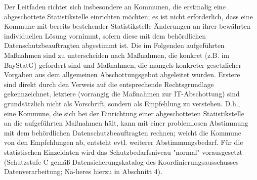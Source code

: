 Der Leitfaden richtet sich insbesondere an Kommunen, die erstmalig eine abgeschottete Statistikstelle einrichten möchten; es ist nicht erforderlich, dass eine Kommune mit bereits bestehender Statistikstelle Änderungen an ihrer bewährten individuellen Lösung vornimmt, sofern diese mit dem behördlichen Datenschutzbeauftragten abgestimmt ist.
Die im Folgenden aufgeführten Maßnahmen sind zu unterscheiden nach Maßnahmen, die konkret (z.B. im BayStatG) gefordert sind und Maßnahmen, die mangels konkreter gesetzlicher Vorgaben aus dem allgemeinen Abschottungsgebot abgeleitet wurden. Erstere sind direkt durch den Verweis auf die entsprechende Rechtsgrundlage gekennzeichnet, letztere (vorrangig die Maßnahmen zur IT-Abschottung) sind grundsätzlich nicht als Vorschrift, sondern als Empfehlung zu verstehen. D.h., eine Kommune, die sich bei der Einrichtung einer abgeschotteten Statistikstelle an die aufgeführten Maßnahmen hält, kann mit einer problemlosen Abstimmung mit dem behördlichen Datenschutzbeauftragten rechnen; weicht die Kommune von den Empfehlungen ab, entsteht evtl. weiterer Abstimmungsbedarf. Für die statistischen Einzeldaten wird das Schutzbedarfsniveau "normal" vorausgesetzt (Schutzstufe C gemäß Datensicherungskatalog des Koordinierungsausschusses Datenverarbeitung; Nä-heres hierzu in Abschnitt 4).